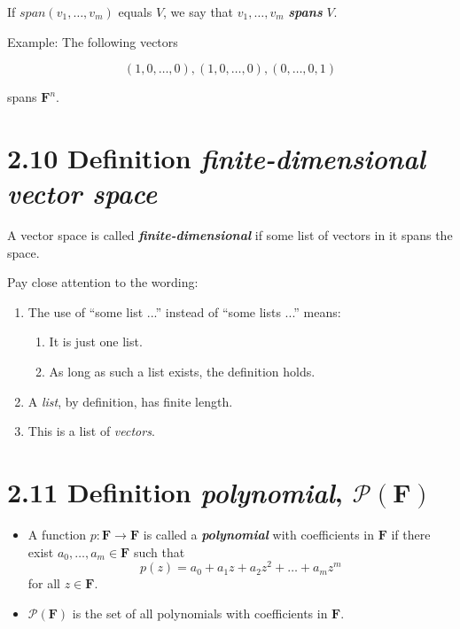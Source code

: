 \documentclass[12pt, letterpaper, oneside]{book}
\begin{document}
If $span(v_1, \ldots, v_m)$ equals $V$, we say that $v_1, \ldots, v_m$ \textbf{
\textit{spans}} $V$.

Example: The following vectors

\[
  (1, 0, \ldots, 0), (1, 0, \ldots, 0), (0, \ldots, 0, 1)
\]

spans $\mathbf{F}^n$.

\section{2.10 Definition \textbf{\textit{finite-dimensional vector space}}}

A vector space is called \textbf{\textit{finite-dimensional}} if some list of
vectors in it spans the space.

Pay close attention to the wording:

\begin{enumerate}
  \item The use of ``some list ...'' instead of ``some lists ...'' means:
  \begin{enumerate}
    \item It is just one list.
    \item As long as such a list exists, the definition holds.
  \end{enumerate}
  \item A \textit{list}, by definition, has finite length.
  \item This is a list of \textit{vectors}.
\end{enumerate}

\section{2.11 Definition \textbf{\textit{polynomial}}, $\mathcal{P}(\mathbf{F})$}

\begin{itemize}
  \item A function $p: \mathbf{F} \rightarrow \mathbf{F}$ is called a \textbf{
    \textit{polynomial}} with coefficients in $\mathbf{F}$ if there exist $a_0,
    \ldots, a_m \in \mathbf{F}$ such that
    \[
      p(z) = a_0 + a_{1}z + a_{2}z^2 + \dots + a_{m}z^m
    \]
    for all $z \in \mathbf{F}$.
  \item $\mathcal{P}(\mathbf{F})$ is the set of all polynomials with
    coefficients in $\mathbf{F}$.
\end{itemize}
\end{document}
